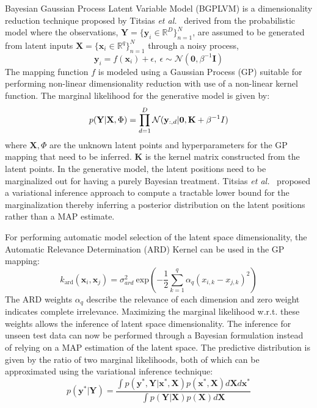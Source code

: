 \documentclass{article}
\begin{document}
Bayesian Gaussian Process Latent Variable Model (BGPLVM) is a dimensionality reduction technique proposed by Titsias \emph{et al.}~\cite{bgplvm}  derived from the probabilistic model where the observations, $\mathbf{Y} = \{\mathbf{y}_{i} \in \mathbb{R}^D\}_{n=1}^N$, are assumed to be generated from latent inputs $\mathbf{X} = \{\mathbf{x}_{i} \in \mathbb{R}^q\}_{n=1}^N$ through a noisy process,
\begin{equation}
  \mathbf{y}_i = f(\mathbf{x}_i) + \epsilon,~\epsilon \sim \mathcal{N}(\mathbf{0},\beta^{-1}\mathbf{I})
\end{equation}
The mapping function $f$ is modeled using a Gaussian Process (GP) suitable for performing non-linear dimensionality reduction with use of a non-linear kernel function. The marginal likelihood for the generative model is given by:
\begin{equation}
  \label{eqn:marginallikelihood}
  p(\mathbf{Y}|\mathbf{X},\Phi) = \prod_{d=1}^{D} \mathcal{N}(\mathbf{y}_{:,d}|\mathbf{0},\mathbf{K}+\beta^{-1}I)\\
\end{equation}
where $\mathbf{X},\Phi$ are the unknown latent points and hyperparameters for the GP mapping that need to be inferred. $\mathbf{K}$ is the kernel matrix constructed from the latent points. In the generative model, the latent positions need to be marginalized out for having a purely Bayesian treatment. Titsias \emph{et al.}~\cite{bgplvm} proposed a variational inference approach to compute a tractable lower bound for the marginalization thereby inferring a posterior distribution on the latent positions rather than a MAP estimate.

For performing automatic model selection of the latent space dimensionality, the Automatic Relevance Determination (ARD) Kernel can be used in the GP mapping:
\begin{equation}
  \label{eqn:ardkernel}
  k_{\text{ard}}(\mathbf{x}_i,\mathbf{x}_j) = \sigma_{ard}^2~\text{exp}\left( - \frac{1}{2} \sum_{k=1}^q{\alpha_q (x_{i,k} - x_{j,k})^2}\right)
\end{equation}
The ARD weights $\alpha_q$ describe the relevance of each dimension and zero weight indicates complete irrelevance. Maximizing the marginal likelihood w.r.t. these weights allows the inference of latent space dimensionality. The inference for unseen test data can now be performed through a Bayesian formulation instead of relying on a MAP estimation of the latent space. The predictive distribution is given by the ratio of two marginal likelihoods, both of which can be approximated using the variational inference technique:
\begin{equation}
	\label{eqn:testinference}
	p(\mathbf{y}^*|\mathbf{Y}) = \frac{\int p(\mathbf{y}^*,\mathbf{Y}|\mathbf{x}^*,\mathbf{X})p(\mathbf{x}^*,\mathbf{X})d\mathbf{X}d\mathbf{x}^*}{\int p(\mathbf{Y}|\mathbf{X})p(\mathbf{X})d\mathbf{X}}
\end{equation}
\end{document}
